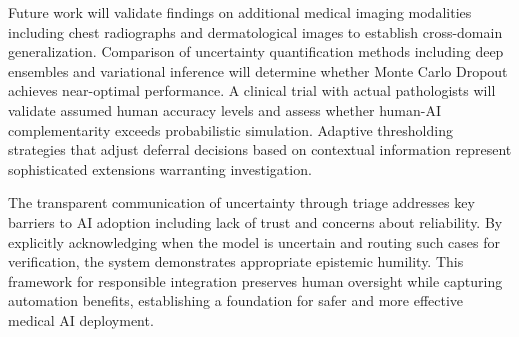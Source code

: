 \documentclass[10pt,a4paper]{article}
\begin{document}
Future work will validate findings on additional medical imaging modalities including chest radiographs and dermatological images to establish cross-domain generalization. Comparison of uncertainty quantification methods including deep ensembles and variational inference will determine whether Monte Carlo Dropout achieves near-optimal performance. A clinical trial with actual pathologists will validate assumed human accuracy levels and assess whether human-AI complementarity exceeds probabilistic simulation. Adaptive thresholding strategies that adjust deferral decisions based on contextual information represent sophisticated extensions warranting investigation.

The transparent communication of uncertainty through triage addresses key barriers to AI adoption including lack of trust and concerns about reliability. By explicitly acknowledging when the model is uncertain and routing such cases for verification, the system demonstrates appropriate epistemic humility. This framework for responsible integration preserves human oversight while capturing automation benefits, establishing a foundation for safer and more effective medical AI deployment.

\printbibliography
\end{document}

